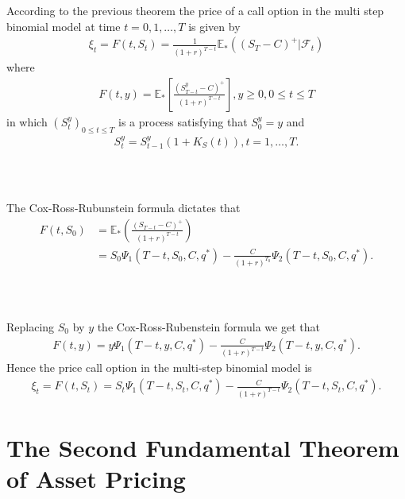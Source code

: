 \documentclass{beamer}
\numberwithin{equation}{section}
\begin{document}
\begin{frame}\frametitle{{\normalsize \secname} \\ {\large \subsecname}}
    According to the previous theorem the price of a call option in the multi step binomial model at time $t = 0,1, \ldots, T$ is given by 
    \begin{align}
        \xi_t = F(t, S_t) = \frac{1}{(1+r)^{T-t}} \mathbb{E}_* \left( (S_T - C)^+ | \mathscr{F}_t \right)
    \end{align}
    where 
    \begin{align}
        F(t,y) = \mathbb{E}_* \left[ \frac{(S_{T-t}^y - C)^+}{(1+r)^{T-t}} \right], y \geq 0, 0 \leq t \leq T
    \end{align}
    in which $(S_t^y)_{0 \leq t \leq T}$ is a process satisfying that $S_0^y = y$ and 
    \begin{align}
        S_t^y = S_{t-1}^y(1 + K_S(t)), t = 1, \ldots, T. 
    \end{align}
\end{frame}

\begin{frame}\frametitle{{\normalsize \secname} \\ {\large \subsecname}}
    The Cox-Ross-Rubunstein formula dictates that 
    \begin{align}
        F(t, S_0) &= \mathbb{E}_* \left(  \frac{(S_{T-t} - C)^+}{(1+r)^{T-t}} \right)\\
        &= S_0 \Psi_1 (T-t, S_0, C, q^*) - \frac{C}{(1+r)^{T_0}} \Psi_2(T-t, S_0, C, q^*).
    \end{align}
\end{frame}

\begin{frame}\frametitle{{\normalsize \secname} \\ {\large \subsecname}}
    Replacing $S_0$ by $y$ the Cox-Ross-Rubenstein formula we get that 
    \begin{align}
        F(t, y) = y \Psi_1 (T-t, y, C, q^*) - \frac{C}{(1+r)^{T-t}}\Psi_2(T-t, y, C, q^*). 
    \end{align}
    Hence the price call option in the multi-step binomial model is 
    \begingroup
    \small
    \begin{align}
        \xi_t = F(t, S_t) = S_t \Psi_1(T-t, S_t,C, q^*) - \frac{C}{(1+r)^{T-t}} \Psi_2(T-t, S_t, C, q^*).
    \end{align}
    \endgroup
\end{frame}

\section{The Second Fundamental Theorem of Asset Pricing}
\end{document}
